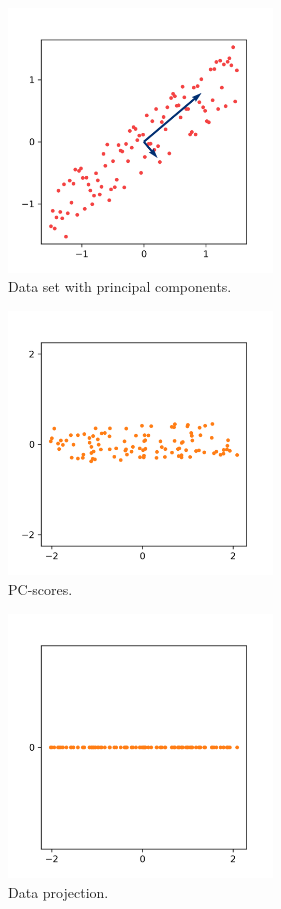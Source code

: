 \documentclass[10pt,twocolumn]{article}
\begin{document}
\begin{figure}[H]
\centering\includegraphics[width=7cm]{python-PCs.png}
\caption{Data set with principal components.}
\label{fig:python-PCs}
\end{figure}

\begin{figure}[H]
\centering\includegraphics[width=7cm]{python-PC-scores.png}
\caption{PC-scores.}
\label{fig:python-PC-scores}
\end{figure}

\begin{figure}[H]
\centering\includegraphics[width=7cm]{python-data-projection.png}
\caption{Data projection.}
\label{fig:python-data-projection}
\end{figure}
\end{document}

